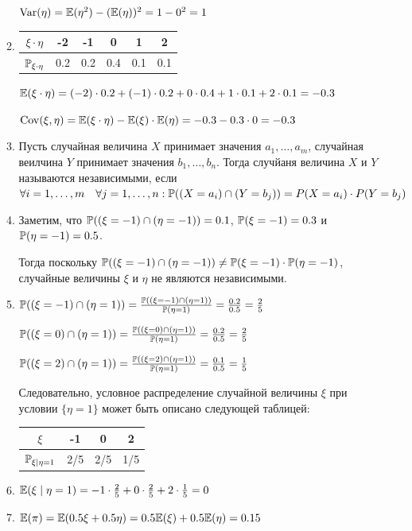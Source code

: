 \documentclass[12pt, a4paper]{article}\usepackage[]{graphicx}\usepackage[]{color}
\begin{document}
\begin{enumerate}
\begin{enumerate}
								$\Var(\eta) = \E(\eta^2)-(\E(\eta))^2 = 1 - 0^2 = 1$

								\item \begin{tabular}{c|ccccc}
									$\xi \cdot \eta$ & -2 & -1 & 0 & 1 & 2 \\ \hline
									$\P_{\xi \cdot \eta}$ & 0.2 & 0.2 & 0.4 & 0.1 & 0.1
								\end{tabular}

								$\E(\xi\cdot\eta) = (-2) \cdot 0.2 + (-1) \cdot 0.2 + 0 \cdot 0.4 + 1\cdot 0.1 + 2 \cdot 0.1 = -0.3$

								$\Cov(\xi, \eta) = \E(\xi\cdot\eta) - \E(\xi)\cdot\E(\eta) = -0.3 - 0.3 \cdot 0 = -0.3$
								\item Пусть случайная величина $X$ принимает значения $a_1, \ldots, a_m$, случайная веилчина $Y$ принимает значения $b_1, \ldots, b_n$. Тогда случйаня величина $X$ и $Y$ называются независимыми, если $\forall i=1, \ldots, m \quad \forall j=1, \ldots, n: \P((X = a_i) \cap (Y = b_j)) = P(X = a_i) \cdot P(Y = b_j)$
								\item Заметим, что $\P ((\xi = -1) \cap (\eta=-1))=0.1$, $\P(\xi=-1)=0.3$ и $\P(\eta=-1)=0.5$.

								Тогда поскольку $\P ((\xi = -1) \cap (\eta=-1)) \neq \P(\xi=-1) \cdot \P(\eta=-1)$, случайные величины $\xi$ и $\eta$ не являются независимыми.
								\item $\P ((\xi = -1) \cap (\eta=1)) = \frac{\P ((\xi = -1) \cap (\eta=1))}{\P(\eta=1)} = \frac{0.2}{0.5} = \frac{2}{5}$

								$\P ((\xi = 0) \cap (\eta=1)) = \frac{\P ((\xi = 0) \cap (\eta=1))}{\P(\eta=1)} = \frac{0.2}{0.5} = \frac{2}{5}$

								$\P ((\xi = 2) \cap (\eta=1)) = \frac{\P ((\xi = 2) \cap (\eta=1))}{\P(\eta=1)} = \frac{0.1}{0.5} = \frac{1}{5}$

								Следовательно, условное распределение случайной величины $\xi$ при условии $\{\eta=1\}$ может быть описано следующей таблицей:

								\begin{tabular}{c|ccc}
									$\xi$ & -1 & 0 & 2 \\ \hline
									$\P_{\xi \mid \eta=1}$ & 2/5 & 2/5 & 1/5
								\end{tabular}
								\item $\E(\xi \mid \eta = 1) = -1 \cdot \frac{2}{5} + 0 \cdot \frac{2}{5} + 2 \cdot \frac{1}{5} = 0$
								\item $\E(\pi) = \E(0.5 \xi + 0.5 \eta) = 0.5 \E(\xi) + 0.5 \E(\eta) = 0.15$


\end{enumerate}
\end{enumerate}
\end{document}
